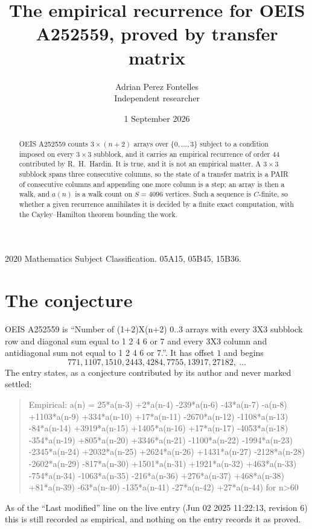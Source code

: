 \documentclass[11pt,a4paper]{article}
\title{The empirical recurrence for OEIS A252559, proved by transfer matrix}
\author{Adrian Perez Fontelles\\ \small Independent researcher}
\date{1 September 2026}
\theoremstyle{plain}
\theoremstyle{definition}
\begin{document}
\maketitle

\begin{abstract}
OEIS A252559 counts $3\times(n+2)$ arrays over $\{0,\dots,3\}$ subject to a condition imposed on
every $3\times3$ subblock, and it carries an empirical recurrence of order $44$
contributed by R.~H.~Hardin. It is true, and it is not an empirical matter. A $3\times3$
subblock spans three consecutive columns, so the state of a transfer matrix is a PAIR of
consecutive columns and appending one more column is a step; an array is then a walk, and
$a(n)$ is a walk count on $S=4096$ vertices. Such a sequence is $C$-finite, so whether a given
recurrence annihilates it is decided by a finite exact computation, with the Cayley--Hamilton
theorem bounding the work.
\end{abstract}

\noindent\small 2020 Mathematics Subject Classification. 05A15, 05B45, 15B36.\normalsize

\section{The conjecture}

OEIS A252559 is ``Number of (1+2)X(n+2) 0..3 arrays with every 3X3 subblock row and diagonal sum equal to 1 2 4 6 or 7 and every 3X3 column and antidiagonal sum not equal to 1 2 4 6 or 7.''. It has offset $1$ and begins
\[
771, 1107, 1510, 2443, 4284, 7755, 13917, 27182,\ \dots
\]
The entry states, as a conjecture contributed by its author and never marked settled:
\begin{quote}
Empirical: a(n) = 25*a(n-3) +2*a(n-4) -239*a(n-6) -43*a(n-7) -a(n-8) +1103*a(n-9) +334*a(n-10) +17*a(n-11) -2670*a(n-12) -1108*a(n-13) -84*a(n-14) +3919*a(n-15) +1405*a(n-16) +17*a(n-17) -4053*a(n-18) -354*a(n-19) +805*a(n-20) +3346*a(n-21) -1100*a(n-22) -1994*a(n-23) -2345*a(n-24) +2032*a(n-25) +2624*a(n-26) +1431*a(n-27) -2128*a(n-28) -2602*a(n-29) -817*a(n-30) +1501*a(n-31) +1921*a(n-32) +463*a(n-33) -754*a(n-34) -1063*a(n-35) -216*a(n-36) +276*a(n-37) +468*a(n-38) +81*a(n-39) -63*a(n-40) -135*a(n-41) -27*a(n-42) +27*a(n-44) for n>60
\end{quote}
As of the ``Last modified'' line on the live entry (Jun 02 2025 11:22:13, revision 6) this is still
recorded as empirical, and nothing on the entry records it as proved.
\end{document}
